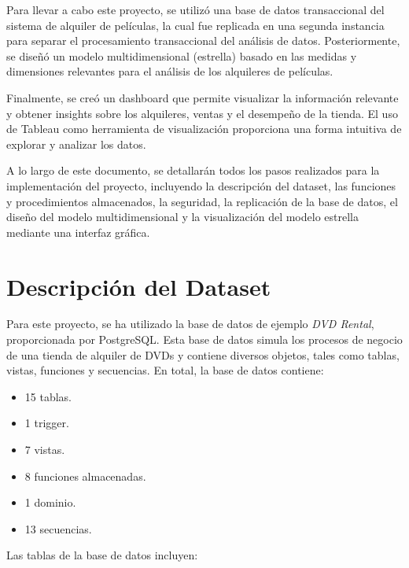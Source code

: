 \documentclass{article}
\begin{document}
Para llevar a cabo este proyecto, se utilizó una base de datos transaccional del sistema de alquiler de películas,
la cual fue replicada en una segunda instancia para separar el procesamiento transaccional del análisis de
datos. Posteriormente, se diseñó un modelo multidimensional (estrella) basado en las medidas y dimensiones relevantes
para el análisis de los alquileres de películas.

Finalmente, se creó un dashboard que permite visualizar la información relevante y obtener insights sobre los alquileres, ventas y el desempeño de la tienda. El uso de Tableau como herramienta de visualización proporciona una forma intuitiva de explorar y analizar los datos.

A lo largo de este documento, se detallarán todos los pasos realizados para la implementación del proyecto, incluyendo la descripción del dataset, las funciones y procedimientos almacenados, la seguridad, la replicación de la base de datos, el diseño del modelo multidimensional y la visualización del modelo estrella mediante una interfaz gráfica.

\newpage

\section{Descripción del Dataset}

Para este proyecto, se ha utilizado la base de datos de ejemplo \textit{DVD Rental}, proporcionada por PostgreSQL. Esta base de datos simula los procesos de negocio de una tienda de alquiler de DVDs y contiene diversos objetos, tales como tablas, vistas, funciones y secuencias. En total, la base de datos contiene:

\begin{itemize}
    \item 15 tablas.
    \item 1 trigger.
    \item 7 vistas.
    \item 8 funciones almacenadas.
    \item 1 dominio.
    \item 13 secuencias.
\end{itemize}

Las tablas de la base de datos incluyen:
\end{document}
